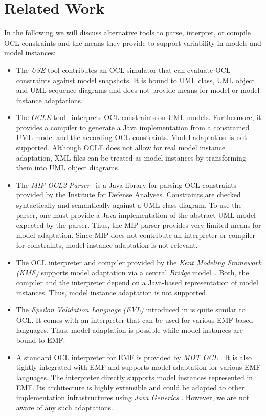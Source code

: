 \section{Related Work}
\label{sec:relatedWork}
In the following we will discuss alternative tools to parse,
interpret, or compile OCL constraints and the means they provide
to support variability in models and model instances:

\begin{itemize}
  
\item The \emph{USE} tool \cite{gogolla2007use} contributes an OCL simulator that can
evaluate OCL constraints against model snapshots. It is bound to UML class, UML object and
UML sequence diagrams and does not provide means for model or model instance
adaptations.

\item The \emph{OCLE} tool~\cite{WWW:OCLE} interprets OCL constraints on
UML models. Furthermore, it provides a compiler to generate a Java
implementation from a constrained UML model and the according OCL 
constraints. Model adaptation is not supported. Although OCLE does not allow for
real model instance adaptation, XML files can be treated as model instances by
transforming them into UML object diagrams.

\item The \emph{MIP OCL2 Parser}~\cite{WWW:MIP} is a Java library for parsing OCL
constraints provided by the Institute for Defense Analyses. Constraints are
checked syntactically and semantically against a UML class diagram.
To use the parser, one must provide a Java implementation of the abstract 
UML model expected by the parser. Thus,
the MIP parser provides very limited means for model adaptation. Since MIP does
not contribute an interpreter or compiler for constraints, model
instance adaptation is not relevant.

\item The OCL interpreter and compiler provided by the \emph{Kent Modeling Framework
(KMF)} supports model adaptation via a central \emph{Bridge}
model~\cite{akehurst2003ocl}. Both, the compiler and the interpreter depend on a
Java-based representation of model instances. Thus, model instance adaptation is not
supported.

\item The \emph{Epsilon Validation Language (EVL)} introduced in
\cite{kolovos2008detecting} is quite similar to OCL. It comes with an
interpreter that can be used for various EMF-based languages. Thus, model
adaptation is possible while model instances are bound to EMF.
 
\item A standard OCL interpreter for EMF is provided by \emph{MDT OCL}
\cite{WWW:MDT}. It is also tightly integrated with EMF and supports 
model adaptation for various EMF languages. The interpreter directly supports
model instances represented in EMF. Its architecture is highly extensible
and could be adapted to other implementation
infrastructures using \emph{Java Generics} \cite{damus:EclipseCon08}. 
However, we are not aware of any such adaptations.

\end{itemize}

